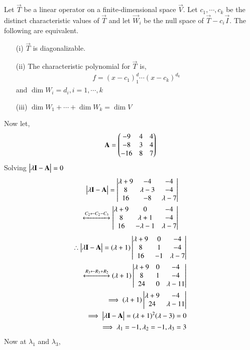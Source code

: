 Let $\vec{T}$ be a linear operator on a finite-dimensional space $\vec{V}$. Let $c_1, \cdots, c_k$ be the distinct characteristic values of $\vec{T}$ and let $\vec{W}_i$ be the null space of $\vec{T}-c_i\vec{I}$. The following are equivalent.
\begin{enumerate}
\item[(i)] $\vec{T}$ is diagonalizable.
\item[(ii)] The characteristic polynomial for $\vec{T}$ is,
\begin{align}
f = (x-c_1)^d_1 \cdots (x - c_k)^{d_k}
\end{align}
and $\dim W_i = d_i, i=1,\cdots ,k$
\item[(iii)] $\dim W_1+\cdots+\dim W_k = \dim V$ 
\end{enumerate}  
Now let,
\begin{align}
\mathbf{A} = \begin{pmatrix}-9&4&4\\-8&3&4\\-16&8&7\end{pmatrix}
\label{eq:solutions/6/2/4/A}
\end{align} 
Solving $\begin{vmatrix}\lambda \mathbf{I} - \mathbf{A}\end{vmatrix} = 0$
\begin{align}
\begin{vmatrix}\lambda \mathbf{I} - \mathbf{A}\end{vmatrix} = \begin{vmatrix}\lambda + 9&-4&-4\\8&\lambda - 3&-4\\16&-8&\lambda - 7\end{vmatrix}\\
\xleftrightarrow[]{C_2\leftarrow C_2-C_3} \begin{vmatrix}\lambda + 9&0&-4\\8&\lambda + 1&-4\\16&-\lambda - 1&\lambda - 7\end{vmatrix}
\end{align}
\begin{align}
\therefore \begin{vmatrix}\lambda \mathbf{I} - \mathbf{A}\end{vmatrix} = (\lambda + 1)\begin{vmatrix}\lambda + 9&0&-4\\8&1&-4\\16&-1&\lambda - 7\end{vmatrix}\\
\xleftrightarrow[]{R_3\leftarrow R_3+R_2} (\lambda + 1)\begin{vmatrix}\lambda + 9&0&-4\\8&1&-4\\24&0&\lambda - 11\end{vmatrix}\\
\implies (\lambda + 1)\begin{vmatrix}\lambda + 9 & -4\\24& \lambda - 11\end{vmatrix}\\
\implies \begin{vmatrix}\lambda \mathbf{I} - \mathbf{A}\end{vmatrix} = (\lambda + 1)^{2}(\lambda - 3) = 0\\
\implies \lambda_1 = -1, \lambda_2 = -1, \lambda_3 =3
\label{eq:solutions/6/2/4/lambda}
\end{align} 
Now at $\lambda_1$ and $\lambda_3$,
